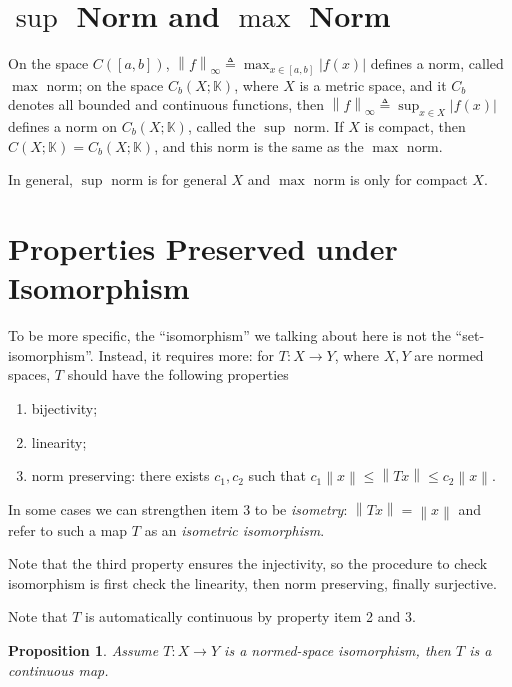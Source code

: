 \documentclass[12pt,a4paper]{report}
\numberwithin{equation}{section}
\theoremstyle{mystyle}
\newtheorem{proposition}[definition]{Proposition}
\newcommand{\K}{\mathbb{K}}
\newcommand{\norm}[1]{\left\lVert #1 \right\rVert}
\begin{document}
	\section{$\sup$ Norm and $\max$ Norm}
	On the space $C([a,b])$, $\norm{f}_{\infty}\triangleq \max_{x\in [a,b]}|f(x)|$ defines a norm, called $\max$ norm; on the space $C_b(X;\K)$, where $X$ is a metric space, and it $C_b$ denotes all bounded and continuous functions, then $\norm{f}_\infty\triangleq \sup_{x\in X}|f(x)|$ defines a norm on $C_b(X;\K)$, called the $\sup$ norm. If $X$ is compact, then $C(X;\K)=C_b(X;\K)$, and this norm is the same as the $\max$ norm.
	
	In general, $\sup$ norm is for general $X$ and $\max$ norm is only for compact $X$.









	\section{Properties Preserved under Isomorphism}
	To be more specific, the ``isomorphism'' we talking about here is not the ``set-isomorphism''. Instead, it requires more: for $T:X\to Y$, where $X,Y$ are normed spaces, $T$ should have the following properties
	\begin{enumerate}
		\item bijectivity;
		\item linearity;
		\item norm preserving: there exists $c_1,c_2$ such that $c_1\norm{x}\leq \norm{Tx}\leq c_2\norm{x}$.
	\end{enumerate}
	In some cases we can strengthen item 3 to be \emph{isometry}: $\norm{Tx}=\norm{x}$ and refer to such a map $T$ as an \emph{isometric isomorphism}.
	
	Note that the third property ensures the injectivity, so the procedure to check isomorphism is first check the linearity, then norm preserving, finally surjective.
	
	Note that $T$ is automatically continuous by property item 2 and 3.
	\begin{proposition}
		Assume $T:X\to Y$ is a normed-space isomorphism, then $T$ is a continuous map.
	\end{proposition}
	
\end{document}
